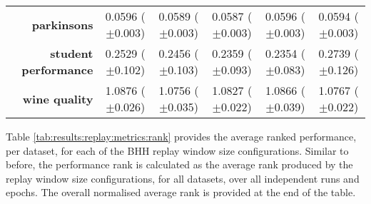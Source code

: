 \begin{table}[htb]
{\begin{tabular}{r|ccccc}
			\textbf{parkinsons}          & \cellcolor[rgb]{ .973,  .412,  .42}0.0596 ($\pm$0.003)  & \cellcolor[rgb]{ .576,  .8,  .49}0.0589 ($\pm$0.003)    & \cellcolor[rgb]{ .388,  .745,  .482}0.0587 ($\pm$0.003) & \cellcolor[rgb]{ .976,  .424,  .424}0.0596 ($\pm$0.003) & \cellcolor[rgb]{ 1,  .922,  .518}0.0594 ($\pm$0.003)    \\
			\textbf{student performance} & \cellcolor[rgb]{ .996,  .792,  .494}0.2529 ($\pm$0.102) & \cellcolor[rgb]{ 1,  .922,  .518}0.2456 ($\pm$0.103)    & \cellcolor[rgb]{ .42,  .753,  .482}0.2359 ($\pm$0.093)  & \cellcolor[rgb]{ .388,  .745,  .482}0.2354 ($\pm$0.083) & \cellcolor[rgb]{ .973,  .412,  .42}0.2739 ($\pm$0.126)  \\
			\textbf{wine quality}        & \cellcolor[rgb]{ .973,  .412,  .42}1.0876 ($\pm$0.026)  & \cellcolor[rgb]{ .388,  .745,  .482}1.0756 ($\pm$0.035) & \cellcolor[rgb]{ 1,  .922,  .518}1.0827 ($\pm$0.022)    & \cellcolor[rgb]{ .98,  .522,  .443}1.0866 ($\pm$0.039)  & \cellcolor[rgb]{ .482,  .773,  .486}1.0767 ($\pm$0.022) \\
		\end{tabular}%
	}
\end{table}%

Table \ref{tab:results:replay:metrics:rank} provides the average ranked performance, per dataset, for each of the \acs{BHH} replay window size configurations. Similar to before, the performance rank is calculated as the average rank produced by the replay window size configurations, for all datasets, over all independent runs and epochs. The overall normalised average rank is provided at the end of the table.

